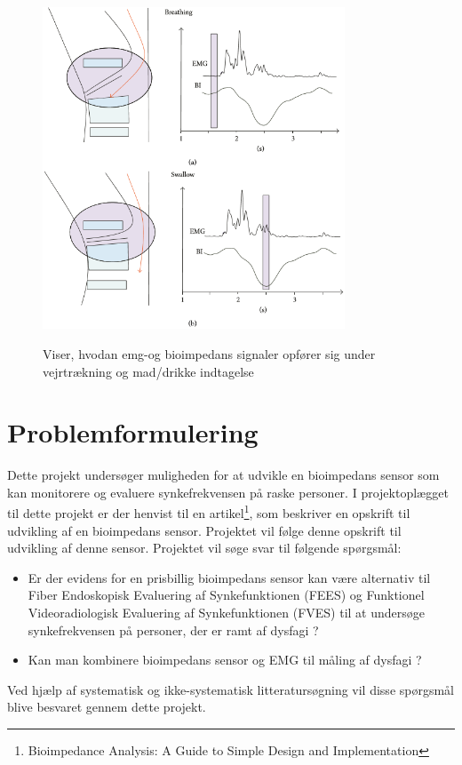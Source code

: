 \begin{figure}[H]
\centering
{\includegraphics[width=9cm]
{Figure/EMGBIGraph}}
\caption{Viser, hvodan emg-og bioimpedans signaler opfører sig under vejrtrækning og mad/drikke indtagelse\cite{Schultheiss2014}}
\label{EMGBIGraph}
\end{figure}

\section{Problemformulering}

Dette projekt undersøger muligheden for at udvikle en bioimpedans sensor som kan monitorere og evaluere synkefrekvensen på raske personer. I projektoplægget til dette projekt er der henvist til en artikel\footnote{Bioimpedance Analysis: A Guide to Simple Design and Implementation}, som beskriver en opskrift til udvikling af en bioimpedans sensor. Projektet vil følge denne opskrift til udvikling af denne sensor. Projektet vil søge svar til følgende spørgsmål: 

\begin{itemize}
\item Er der evidens for en prisbillig bioimpedans sensor kan være alternativ til Fiber Endoskopisk Evaluering af Synkefunktionen (FEES) og Funktionel Videoradiologisk Evaluering af Synkefunktionen (FVES) til at undersøge synkefrekvensen på personer, der er ramt af dysfagi ?
\item Kan man kombinere bioimpedans sensor og EMG til måling af dysfagi ?

\end{itemize}
Ved hjælp af systematisk og ikke-systematisk litteratursøgning vil disse spørgsmål blive besvaret gennem dette projekt. 


